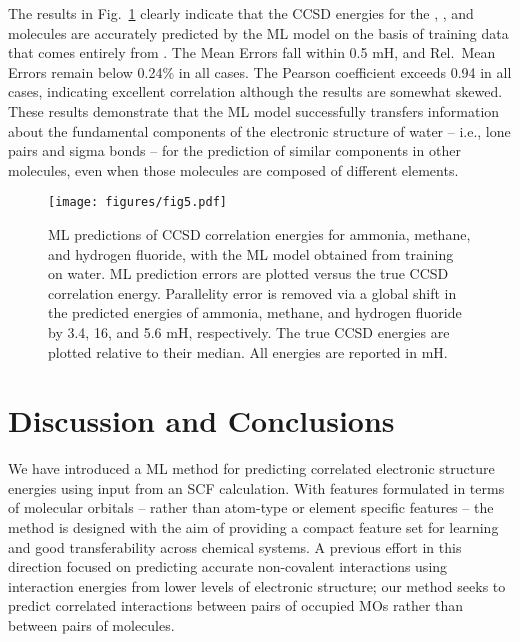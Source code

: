 \documentclass[%
 aps,
 prb,
 twocolumn,
%
 reprint,%
%
citeautoscript,
%
showkeys
]{revtex4-1}
\begin{document}
%
%

The results in Fig.~\ref{figure:water_to_other} clearly indicate that the CCSD energies for the , , and  molecules are accurately predicted by the ML model on the basis of training data that comes entirely from . %
The Mean Errors fall within 0.5 mH, and Rel.~Mean Errors remain below 0.24\% in all cases. The Pearson coefficient exceeds 0.94 in all cases, indicating excellent correlation although the results are somewhat skewed.
These results demonstrate that the ML model successfully transfers information about the fundamental components of the electronic structure of water -- i.e., lone pairs and sigma bonds -- for the prediction of similar components in other molecules, even when those molecules are composed of different elements.


%


%
%

\begin{figure}[htbp]
\texttt{[image: figures/fig5.pdf]}
\caption{
ML predictions of CCSD correlation energies for ammonia, methane, and hydrogen fluoride, with the ML model obtained from training on water. 
ML prediction errors are plotted versus the true CCSD correlation energy.
%
Parallelity error is removed via a 
global shift in the predicted energies of ammonia, methane, and hydrogen fluoride by 3.4, 16, and 5.6 mH, respectively. 
The true CCSD energies are plotted relative to their median.
All energies are reported in mH.
%
}
\label{figure:water_to_other}
\end{figure}

%

%

\section{Discussion and Conclusions}
We have introduced a ML method  for predicting correlated electronic  structure  energies using input from an SCF
calculation. With features formulated in terms of molecular orbitals %
%
-- rather than atom-type or element specific features -- the method is designed with the aim of providing a compact feature set for learning and good transferability across chemical systems.
A previous effort in this direction focused on predicting accurate non-covalent interactions using interaction energies from lower levels of electronic structure;\cite{mcgibbon2017improving} our method seeks to predict correlated interactions between pairs of occupied MOs rather than between pairs of molecules. 
\end{document}
